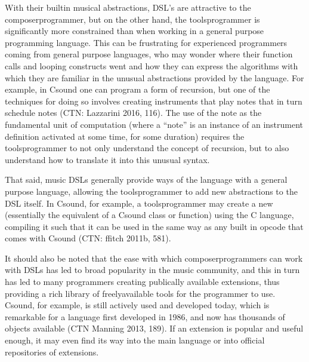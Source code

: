 \documentclass[letterpaper,10pt,english]{sphinxmanual}
\begin{document}
\sphinxAtStartPar
With their built\sphinxhyphen{}in musical abstractions, DSL’s are attractive to the composer\sphinxhyphen{}programmer,
but on the other hand, the tools\sphinxhyphen{}programmer is significantly more constrained than when
working in a general purpose programming language.
This can be frustrating for experienced programmers coming from general purpose languages,
who may wonder where their function calls and looping constructs went and how they can
express the algorithms with which they are familiar in the unusual abstractions provided by the language.
For example, in Csound one can program a form of recursion, but one of the techniques
for doing so involves creating instruments that play notes that in turn schedule notes (CTN: Lazzarini 2016, 116).
The use of the note as the fundamental
unit of computation (where a “note” is an instance of an instrument definition activated at
some time, for some duration) requires the tools\sphinxhyphen{}programmer to not only
understand the concept of recursion, but to also understand how to translate it
into this unusual syntax.

\sphinxAtStartPar
That said, music DSLs generally provide ways of  the language with
a general purpose language, allowing the tools\sphinxhyphen{}programmer to add new abstractions to the DSL itself.
In Csound, for example, a tools\sphinxhyphen{}programmer may create a new  (essentially the equivalent
of a Csound class or function) using the C language,
compiling it such that it can be used in the same way as any built in opcode that comes with Csound
(CTN: ffitch 2011b, 581).

\sphinxAtStartPar
It should also be noted that the ease with which composer\sphinxhyphen{}programmers can work
with DSLs has led to broad popularity in the music community, and this
in turn has led to many programmers creating publically available extensions, thus providing
a rich library of freely\sphinxhyphen{}available tools for the programmer to use.
Csound, for example, is still actively used and developed today, which is
remarkable for a language first developed in 1986, and now has thousands of objects available (CTN Manning 2013, 189).
If an extension is popular and useful enough, it may even find its way into the
main language or into official repositories of extensions.
\end{document}
